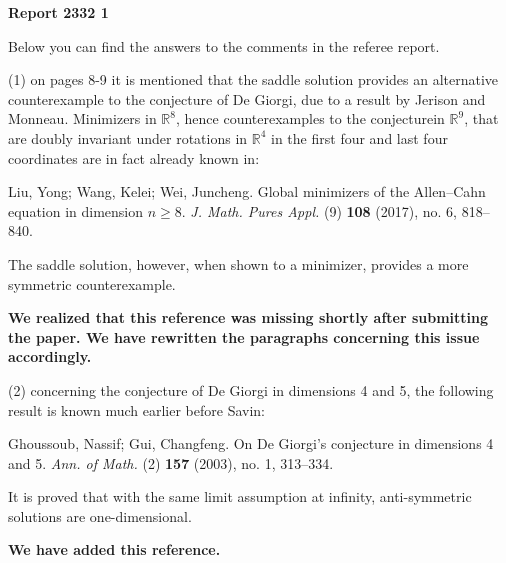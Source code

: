 \documentclass[]{report}
\title{}
\author{}
\begin{document}
	
	\begin{center}
		\textbf{	Report 2332 1}
	\end{center}
	Below you can find the answers to the comments in the referee report.
	
	\medskip
	(1) on pages 8-9 it is mentioned that the saddle solution provides an alternative counterexample to the conjecture of De Giorgi, due to a result by Jerison and Monneau. Minimizers in $\mathbb{R}^8$, hence counterexamples to the conjecturein $\mathbb{R}^9$, that are doubly invariant under rotations in $\mathbb{R}^4$ in the first four and last four coordinates are in fact already known in:
	
	Liu, Yong; Wang, Kelei; Wei, Juncheng. Global minimizers of the Allen--Cahn equation in dimension $n\geq 8$. \textit{J. Math. Pures Appl.} (9) \textbf{108} (2017),
	no. 6, 818--840.
	
	The saddle solution, however, when shown to a minimizer, provides a
	more symmetric counterexample.
	
	\bigskip
	
\textbf{
	We realized that this reference was missing shortly after submitting the paper. We have rewritten the paragraphs concerning this issue accordingly.
	}
	
	\bigskip
	
	(2) concerning the conjecture of De Giorgi in dimensions 4 and 5, the following result is known much earlier before Savin:
	
	Ghoussoub, Nassif; Gui, Changfeng. On De Giorgi’s conjecture in dimensions 4 and 5. \textit{Ann. of Math.  }(2) \textbf{157} (2003), no. 1, 313--334.
	
	It is proved that with the same limit assumption at infinity, anti-symmetric
	solutions are one-dimensional.
	\bigskip
	
\textbf{	
	We have added this reference.
	}
\end{document}
